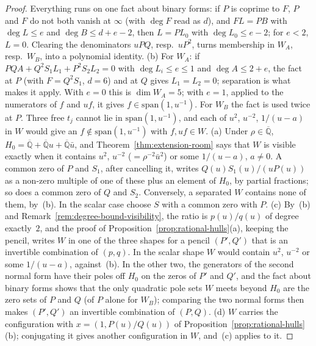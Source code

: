 \documentclass[11pt,a4paper]{article}
\theoremstyle{plain}
\theoremstyle{definition}
\newcommand{\Alg}{\overline{\mathbb{Q}}}
\begin{document}
\begin{proof}
Everything runs on one fact about binary forms: if $P$ is coprime to $F$, $P$ and $F$ do not both vanish at
$\infty$ (with $\deg F$ read as $d$), and $FL=PB$ with $\deg L\le e$ and $\deg B\le d+e-2$, then $L=PL_{0}$ with
$\deg L_{0}\le e-2$; for $e<2$, $L=0$. Clearing the denominators $uPQ$, resp.\ $uP^{2}$, turns membership in $W_{A}$,
resp.\ $W_{B}$, into a polynomial identity. (b) For $W_{A}$: if $PQA+Q^{2}S_{1}L_{1}+P^{2}S_{2}L_{2}=0$ with
$\deg L_{i}\le e\le1$ and $\deg A\le2+e$, the fact at $P$ (with $F=Q^{2}S_{1}$, $d=6$) and at $Q$ gives
$L_{1}=L_{2}=0$; separation is what makes it apply. With $e=0$ this is $\dim W_{A}=5$; with $e=1$, applied to the
numerators of $f$ and $uf$, it gives $f\in\mathrm{span}(1,u^{-1})$. For $W_{B}$ the fact is used twice at $P$.
Three free $t_{j}$ cannot lie in $\mathrm{span}(1,u^{-1})$, and each of $u^{2}$, $u^{-2}$, $1/(u-a)$ in $W$ would give an
$f\notin\mathrm{span}(1,u^{-1})$ with $f,uf\in W$. (a) Under $\rho\in\Alg$, $H_{0}=\Alg+\Alg u+\Alg\bar u$, and
Theorem~\ref{thm:extension-room} says that $W$ is visible exactly when it contains $u^{2}$, $u^{-2}$ ($=\rho^{-2}\bar u^{2}$)
or some $1/(u-a)$, $a\neq0$. A common zero of $P$ and $S_{1}$, after cancelling it, writes $Q(u)S_{1}(u)/(uP(u))$ as a
non-zero multiple of one of these plus an element of $H_{0}$, by partial fractions; so does a common zero of $Q$ and
$S_{2}$. Conversely, a separated $W$ contains none of them, by~(b). In the scalar case choose $S$ with a common zero
with $P$. (c) By~(b) and Remark~\ref{rem:degree-bound-visibility}, the ratio is $p(u)/q(u)$ of degree exactly~$2$,
and the proof of Proposition~\ref{prop:rational-hulls}(a), keeping the pencil, writes $W$ in one of the three shapes for
a pencil $(P',Q')$ that is an invertible combination of $(p,q)$. In the scalar shape $W$ would contain $u^{2}$,
$u^{-2}$ or some $1/(u-a)$, against~(b).
In the other two, the generators of the second normal form have their poles off $H_{0}$ on the zeros of $P'$ and
$Q'$, and the fact about binary forms shows that the only quadratic pole sets $W$ meets beyond $H_{0}$ are the zero
sets of $P$ and $Q$ (of $P$ alone for $W_{B}$); comparing the two normal forms then makes $(P',Q')$ an invertible
combination of $(P,Q)$. (d) $W$ carries the configuration with $x=(1,P(u)/Q(u))$ of
Proposition~\ref{prop:rational-hulls}(b); conjugating it gives another configuration in $W$, and~(c) applies to it.
\end{proof}
\end{document}
